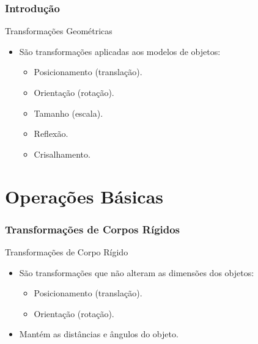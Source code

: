 \documentclass{beamer}
\begin{document}
\begin{frame}
\frametitle{Introdução}


	\begin{block}{Transformações Geométricas}
		\begin{itemize}
			\item São transformações aplicadas aos modelos de objetos:
				\begin{itemize}
					\item Posicionamento (translação).
					\item Orientação (rotação). 
					\item Tamanho (escala).
					\item Reflexão.
					\item Crisalhamento.
				\end{itemize}
		\end{itemize}
	\end{block}
	
\end{frame}

\section{Operações Básicas}
\begin{frame}
\frametitle{Transformações de Corpos Rígidos}


	\begin{block}{Transformações de Corpo Rígido}
		\begin{itemize}
			\item São transformações que não alteram as dimensões dos objetos:
				\begin{itemize}
					\item Posicionamento (translação).
					\item Orientação (rotação).
				\end{itemize}
			\item Mantém as distâncias e ângulos do objeto.
		\end{itemize}
	\end{block}
	
\end{frame}
\end{document}
